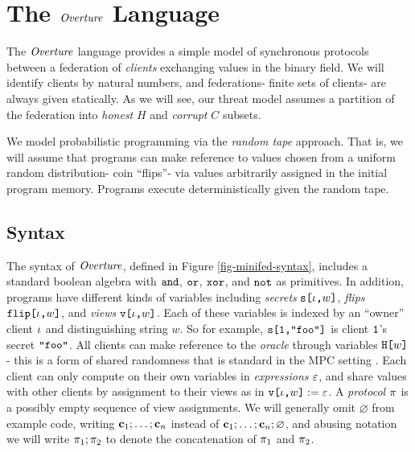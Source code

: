 \section{The $\mathit{Overture}$ Language}
\label{section-minicat}

The $\mathit{Overture}$ language provides a simple model of synchronous
protocols between a federation of \emph{clients} exchanging values in
the binary field. We will identify clients by natural numbers, and
federations- finite sets of clients- are always given statically.
As we will see, our threat model assumes a partition of the federation
into \emph{honest} $H$ and \emph{corrupt} $C$ subsets.

We model probabilistic programming via the \emph{random tape}
approach. That is, we will assume that programs can make reference to
values chosen from a uniform random distribution- coin ``flips''- via
values arbitrarily assigned in the initial program memory.  Programs
execute deterministically given the random tape. 

\subsection{Syntax} The syntax of $\mathit{Overture}$, defined in
Figure \ref{fig-minifed-syntax}, includes a standard boolean algebra
with $\texttt{and}$, $\texttt{or}$, $\texttt{xor}$, and $\texttt{not}$ as primitives. In addition,
programs have different kinds of variables including \emph{secrets}
$\texttt{s[}\iota\texttt{,}w\texttt{]}$, \emph{flips} $\texttt{flip[}\iota\texttt{,}w\texttt{]}$, and \emph{views}
$\texttt{v[}\iota\texttt{,}w\texttt{]}$.  Each of these variables is indexed by an ``owner''
client $\iota$ and distinguishing string $w$. So for example,
$\texttt{s[}\texttt{1}\texttt{,}\texttt{"foo"}\texttt{]}$ is client $\texttt{1}$'s secret 
$\texttt{"foo"}$. All clients can make reference to the \emph{oracle}
through variables $\texttt{H[}w\texttt{]}$- this is a form of shared randomness
that is standard in the MPC setting \cite{evans2018pragmatic}.  Each client can only
compute on their own variables in \emph{expressions} $\varepsilon$, and share
values with other clients by assignment to their views as in
$\texttt{v[}\iota\texttt{,}w\texttt{]} := \varepsilon$.  A \emph{protocol} $\pi$ is a
possibly empty sequence of view assignments. We will generally omit
$\varnothing$ from example code, writing $\mathbf{c}_1;\ldots;\mathbf{c}_n$
instead of $\mathbf{c}_1;\ldots;\mathbf{c}_n;\varnothing$, and abusing notation we will
write $\pi_1;\pi_2$ to denote the concatenation of $\pi_1$
and $\pi_2$.



